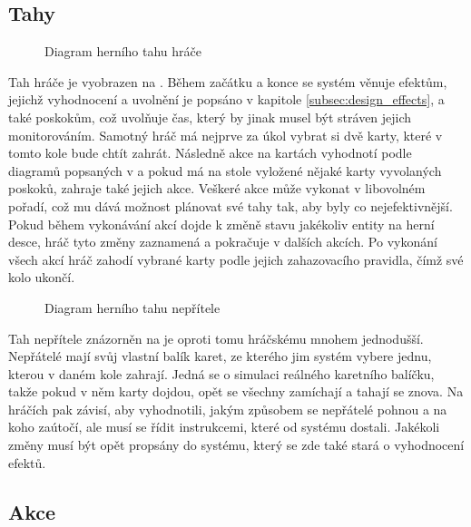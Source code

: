 \subsection{Tahy}
\label{subsec:design_turns}

\begin{figure}[h]
    \centering
    \caption{Diagram herního tahu hráče}
    \label{diag:player_turn}
\end{figure}

Tah hráče je vyobrazen na . Během začátku a konce se systém věnuje efektům, jejichž vyhodnocení a uvolnění je popsáno v kapitole \ref{subsec:design_effects}, a také poskokům, což uvolňuje čas, který by jinak musel být stráven jejich monitorováním. Samotný hráč má nejprve za úkol vybrat si dvě karty, které v tomto kole bude chtít zahrát. Následně akce na kartách vyhodnotí podle diagramů popsaných v  a pokud má na stole vyložené nějaké karty vyvolaných poskoků, zahraje také jejich akce. Veškeré akce může vykonat v libovolném pořadí, což mu dává možnost plánovat své tahy tak, aby byly co nejefektivnější. Pokud během vykonávání akcí dojde k změně stavu jakékoliv entity na herní desce, hráč tyto změny zaznamená a pokračuje v dalších akcích. Po vykonání všech akcí hráč zahodí vybrané karty podle jejich zahazovacího pravidla, čímž své kolo ukončí.

\begin{figure}[h]
    \centering
    \caption{Diagram herního tahu nepřítele}
    \label{diag:enemy_turn}
\end{figure}

Tah nepřítele znázorněn na  je oproti tomu hráčskému mnohem jednodušší. Nepřátelé mají svůj vlastní balík karet, ze kterého jim systém vybere jednu, kterou v daném kole zahrají. Jedná se o simulaci reálného karetního balíčku, takže pokud v něm karty dojdou, opět se všechny zamíchají a tahají se znova. Na hráčích pak závisí, aby vyhodnotili, jakým způsobem se nepřátelé pohnou a na koho zaútočí, ale musí se řídit instrukcemi, které od systému dostali. Jakékoli změny musí být opět propsány do systému, který se zde také stará o vyhodnocení efektů.


\subsection{Akce}
\label{subsec:design_actions}


